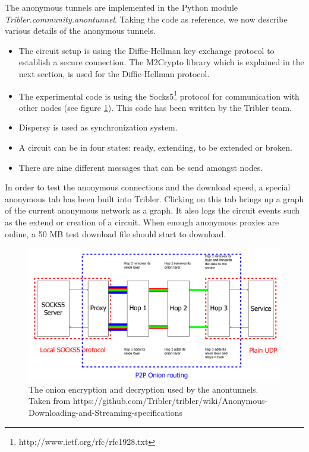			The anonymous tunnels are implemented in the Python module \emph{Tribler.community.anontunnel}. Taking the code as reference, we now describe various details of the anonymous tunnels.
			
			\begin{itemize} 
				\item The circuit setup is using the Diffie-Hellman key exchange protocol to establish a secure connection. The M2Crypto library which is explained in the next section, is used for the Diffie-Hellman protocol.
				\item The experimental code is using the Socks5\footnote{http://www.ietf.org/rfc/rfc1928.txt} protocol for communication with other nodes (see figure \ref{fig:onion_encryption_decryption_socks5}). This code has been written by the Tribler team.
				\item Dispersy is used as synchronization system. 
				\item A circuit can be in four states: ready, extending, to be extended or broken.
				\item There are nine different messages that can be send amongst nodes.
			\end{itemize}
			
			In order to test the anonymous connections and the download speed, a special anonymous tab has been built into Tribler. Clicking on this tab brings up a graph of the current anonymous network as a graph. It also logs the circuit events such as the extend or creation of a circuit. When enough anonymous proxies are online, a 50 MB test download file should start to download.
			
			\begin{figure}[!htb]
				\centering
				\includegraphics[width=\textwidth]{graphics/onion_encryption_decryption_socks5.png}
				\caption{The onion encryption and decryption used by the anontunnels. Taken from https://github.com/Tribler/tribler/wiki/Anonymous-Downloading-and-Streaming-specifications}
				\label{fig:onion_encryption_decryption_socks5}
			\end{figure}

